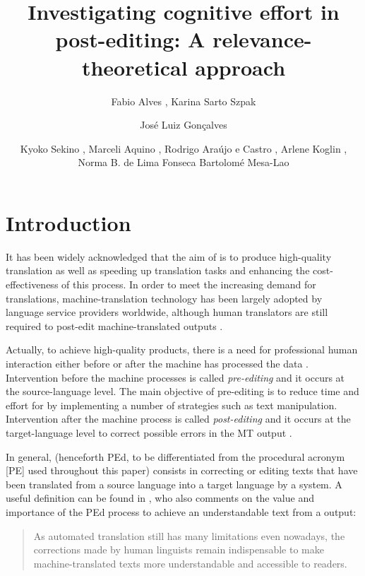 \documentclass[output=paper]{langsci/langscibook}
\author{%
Fabio Alves{\ufmg}%
, 
Karina Sarto Szpak{\ufmg}%
\affiliation{UFMG}%
\and
José Luiz Gonçalves{\ufop}%
\affiliation{UFOP}%
\and
Kyoko Sekino{\ufmg}%
,
Marceli Aquino{\ufmg}%
,
Rodrigo Araújo e Castro{\ufmg}%
,
{Arlene} Koglin{\ufmg}%
,
Norma B. de Lima Fonseca{\ufmg}%
\affiliation{UFMG}%
 \lastand
Bartolomé Mesa-Lao{\cbs}
\affiliation{CBS}%
}
\title{Investigating cognitive effort in post-editing: {A} relevance-theoretical approach}
\begin{document}
\section{Introduction\label{alves:sec:Introduction}}

It has been widely acknowledged that the aim of  is to produce high-quality translation as well as speeding up translation tasks and enhancing the cost-effectiveness of this process. In order to meet the increasing demand for translations, machine-translation technology has been largely adopted by language service providers worldwide, although human translators are still required to post-edit machine-translated outputs \citep[17]{almeida2013}. 


Actually, to achieve high-quality products, there is a need for professional human interaction either before or after the machine has processed the data \citep[3]{obrien2004}. Intervention before the machine processes is called \textit{pre-editing} and it occurs at the source-language level. The main objective of pre-editing is to reduce time and effort for  by implementing a number of strategies such as text manipulation. Intervention after the machine process is called \textit{post-editing} and it occurs at the target-language level to correct possible errors in the MT output \citep{MesaLao2013}. 



In general,  (henceforth PEd, to be differentiated from the procedural  acronym [PE] used throughout this paper) consists in correcting or editing texts that have been translated from a source language into a target language by a  system. A useful definition can be found in \citet{Somers2001}, who also comments on the value and importance of the PEd process to achieve an understandable text from a  output: 


\begin{quote}
As automated translation still has many limitations even nowadays, the corrections made by human linguists remain indispensable to make machine-translated texts more understandable and accessible to readers. \citep[138]{Somers2001}
\end{quote}
\end{document}
